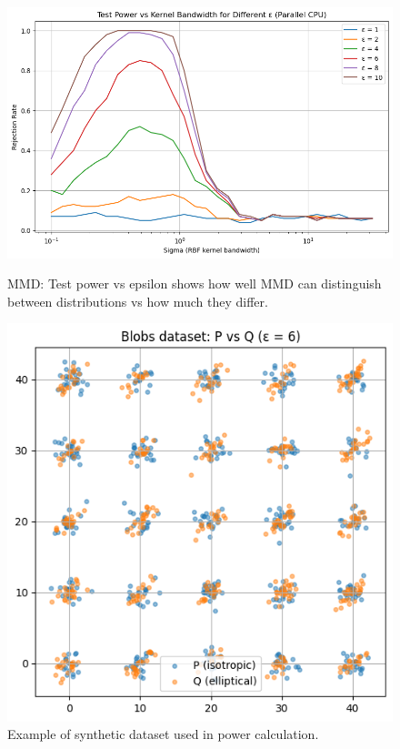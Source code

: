 \documentclass{article}
\begin{document}
\begin{figure}
  \centering
  \begin{minipage}{0.45\textwidth}
    \centering
    \includegraphics[width=\textwidth]{MMD/Test_powe_vs_eps.png}
    \caption{MMD: Test power vs epsilon shows how well MMD can distinguish between distributions vs how much they differ.}
    \label{fig:mmd_power}
  \end{minipage}
  \hfill
  \begin{minipage}{0.45\textwidth}
    \centering
    \includegraphics[width=\textwidth]{MMD/Example.png}
    \caption{Example of synthetic dataset used in power calculation.}
    \label{fig:mmd_example}
  \end{minipage}
  

\end{figure}
\end{document}
